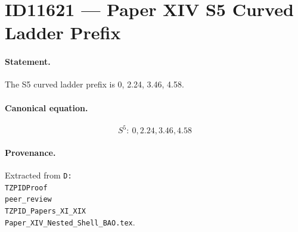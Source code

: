 \section*{ID11621 --- Paper XIV S5 Curved Ladder Prefix}

\paragraph{Statement.}
The S5 curved ladder prefix is 0, 2.24, 3.46, 4.58.

\paragraph{Canonical equation.}
\[
S^5:\ 0,2.24,3.46,4.58
\]

\paragraph{Provenance.}
Extracted from \texttt{D:\\TZPIDProof\\peer\_review\\TZPID\_Papers\_XI\_XIX\\Paper\_XIV\_Nested\_Shell\_BAO.tex}.
